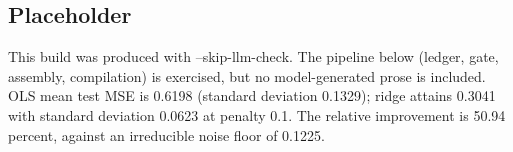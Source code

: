\subsection*{Placeholder}
This build was produced with --skip-llm-check. The pipeline below (ledger, gate, assembly, compilation) is exercised, but no model-generated prose is included.
OLS mean test MSE is 0.6198 (standard deviation 0.1329); ridge attains 0.3041 with standard deviation 0.0623 at penalty 0.1. The relative improvement is 50.94 percent, against an irreducible noise floor of 0.1225.
